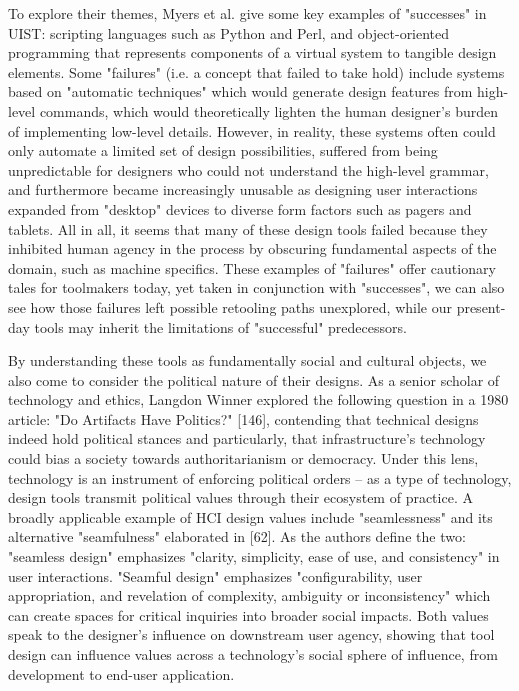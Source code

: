 To explore their themes, Myers et al. give some key examples of "successes" in UIST: scripting languages such as Python and Perl, and object-oriented programming that represents components of a virtual system to tangible design elements. Some "failures" (i.e. a concept that failed to take hold) include systems based on "automatic techniques" which would generate design features from high-level commands, which would theoretically lighten the human designer's burden of implementing low-level details. However, in reality, these systems often could only automate a limited set of design possibilities, suffered from being unpredictable for designers who could not understand the high-level grammar, and furthermore became increasingly unusable as designing user interactions expanded from "desktop" devices to diverse form factors such as pagers and tablets. All in all, it seems that many of these design tools failed because they inhibited human agency in the process by obscuring fundamental aspects of the domain, such as machine specifics. These examples of "failures" offer cautionary tales for toolmakers today, yet taken in conjunction with "successes", we can also see how those failures left possible retooling paths unexplored, while our present-day tools may inherit the limitations of "successful" predecessors.

By understanding these tools as fundamentally social and cultural objects, we also come to consider the political nature of their designs. As a senior scholar of technology and ethics, Langdon Winner explored the following question in a 1980 article: "Do Artifacts Have Politics?" [146], contending that technical designs indeed hold political stances and particularly, that infrastructure's technology could bias a society towards authoritarianism or democracy. Under this lens, technology is an instrument of enforcing political orders – as a type of technology, design tools transmit political values through their ecosystem of practice. A broadly applicable example of HCI design values include "seamlessness" and its alternative "seamfulness" elaborated in [62]. As the authors define the two: "seamless design" emphasizes "clarity, simplicity, ease of use, and consistency" in user interactions. "Seamful design" emphasizes "configurability, user appropriation, and revelation of complexity, ambiguity or inconsistency" which can create spaces for critical inquiries into broader social impacts. Both values speak to the designer's influence on downstream user agency, showing that tool design can influence values across a technology's social sphere of influence, from development to end-user application. 

